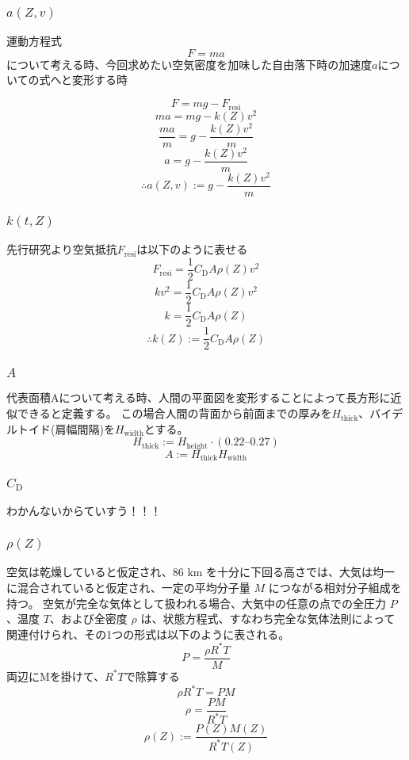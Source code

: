 \documentclass[a4paper,12pt]{article}
\begin{document}
\subsubsection{$a(Z, v)$}
運動方程式
\[
  F = ma
\]
について考える時、今回求めたい空気密度を加味した自由落下時の加速度$a$についての式へと変形する時

\[
  F = mg - F_{\mathrm{resi}}
\]
\[
  ma = mg - k(Z)v^2
\]
\[
  \frac{ma}{m} = g - \frac{k(Z)v^2}{m}
\]
\[
  a = g - \frac{k(Z)v^2}{m}
\]
\[
  \therefore a(Z, v) := g - \frac{k(Z)v^2}{m}
\]

\subsubsection{$k(t, Z)$}
先行研究より空気抵抗$F_{\mathrm{resi}}$は以下のように表せる
\[
  F_{\mathrm{resi}} = \frac{1}{2}C_{\mathrm{D}}A\rho(Z)v^2
\]
\[
  kv^2 = \frac{1}{2}C_{\mathrm{D}}A\rho(Z)v^2
\]
\[
  k = \frac{1}{2}C_{\mathrm{D}}A\rho(Z)
\]
\[
  \therefore k(Z) := \frac{1}{2}C_{\mathrm{D}}A\rho(Z)
\]

\subsubsection{$A$}
代表面積Aについて考える時、人間の平面図を変形することによって長方形に近似できると定義する。
この場合人間の背面から前面までの厚みを$H_{\mathrm{thick}}$、バイデルトイド(肩幅間隔)を$H_{\mathrm{width}}$とする。
\[
H_{\mathrm{thick}} := H_{\mathrm{height}} \cdot (0.22 \text{--} 0.27)
\]
\[
A := H_{\mathrm{thick}} H_{\mathrm{width}}
\]

\subsubsection{$C_{\mathrm{D}}$}
わかんないからていすう！！！ %


\subsubsection{$\rho(Z)$}
空気は乾燥していると仮定され、86 km を十分に下回る高さでは、大気は均一に混合されていると仮定され、一定の平均分子量 $M$ につながる相対分子組成を持つ。
空気が完全な気体として扱われる場合、大気中の任意の点での全圧力 $P$、温度 $T$、および全密度 $\rho$ は、状態方程式、すなわち完全な気体法則によって関連付けられ、その1つの形式は以下のように表される。
\[
P = \frac{\rho R^* T}{M}
\]
両辺にMを掛けて、$R^*T$で除算する
\[
\rho R^* T = PM
\]
\[
  \rho = \frac{P M}{R^* T}
\]
\[
  \rho(Z) := \frac{P(Z) M(Z)}{R^* T(Z)}
\]
\end{document}
